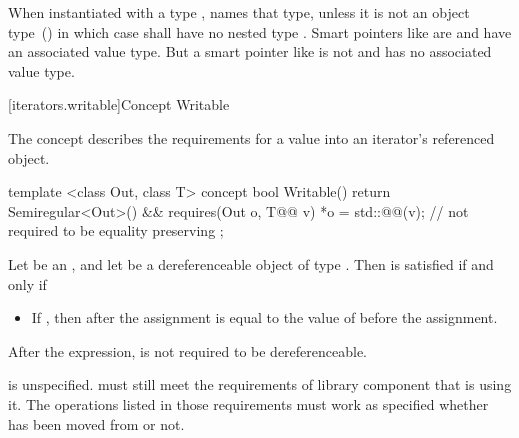 \begin{addedblock}
\pnum
When instantiated with a type 
,
 names that type, unless it is not an object type~() in which case
 shall have no nested type . \enternote Smart pointers like
 are  and have an associated value type. But a smart pointer
like  is not  and has no associated value type.\exitnote

[iterators.writable]{Concept Writable}

\pnum
The  concept describes the requirements for  a value into an iterator's
referenced object.

%
\begin{codeblock}
  template <class Out, class T>
  concept bool Writable() {
    return Semiregular<Out>() &&
      requires(Out o, T@\newtxt{\&\&}@ v) {
        *o = std::@@(v); // not required to be equality preserving
      };
  }
\end{codeblock}

\pnum
Let  be an  , and let 
be a dereferenceable object of type . Then  is satisfied if and only if

\begin{itemize}
\item If ,
then after the assignment is equal
to the value of  before the assignment.
\end{itemize}

\pnum
After the expression,  is not required to be dereferenceable.

\pnum
{} is unspecified. \enternote {} must still meet the
requirements of  library component that is using it. The operations listed
in those requirements must work as specified whether  has been moved
from or not.\exitnote



\end{addedblock}
